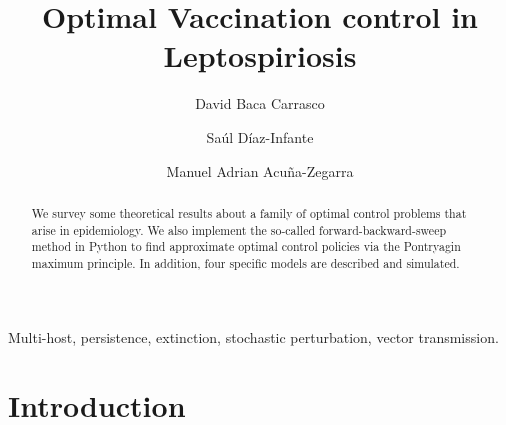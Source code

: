 \documentclass[3p,sort&compress]{elsarticle}
\DeclareRobustCommand{\1}[1]{\ensuremath \mathbbm{1}_{\{#1\}}}
\begin{document}
    \begin{frontmatter}
        \title{
            Optimal Vaccination control in Leptospiriosis
        }
        \author[add:unison]{%
            David Baca Carrasco
        }%
        \author[add:conacyt_unison]{%
            Sa\'ul D\'iaz-Infante
        }%
        \author[add:unison]{%
            Manuel Adrian Acu\~na-Zegarra
        }%

    \address[add:conacyt_unison]{
        CONACYT-Universidad de Sonora, 
        Departamento de Matem\'aticas, Boulevard Luis Encinas y 
        Rosales S/N, 83000, Hermosillo, Sonora, M\'exico.
    }
    \address[add:itson]{
         ITSON's address
    }
        \begin{abstract}
            We survey some theoretical results about a family of optimal 
            control problems that arise in epidemiology. We also implement the
            so-called forward-backward-sweep method in Python to find approximate
            optimal control policies via the Pontryagin maximum principle. 
            In addition, four specific models are described and simulated.
        \end{abstract}
        \begin{keyword}
            Multi-host, persistence, extinction, stochastic perturbation,
            vector transmission.
        \end{keyword}
    \end{frontmatter}
    \linenumbers
%
%
\section{Introduction}
 
\end{document}
